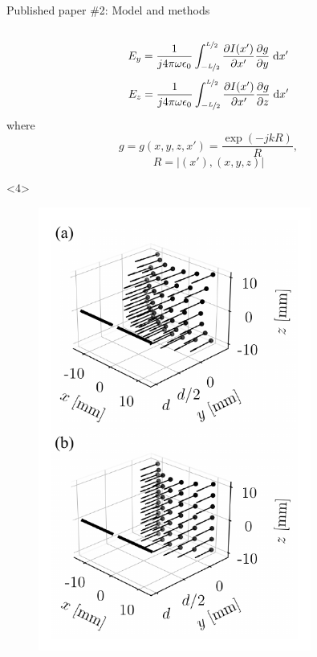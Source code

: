 \documentclass[xcolor=dvipsnames,10pt]{beamer}
\begin{document}
\begin{frame}{Published paper \#2: Model and methods}
\begin{columns}[c]
\begin{column}{0.4\textwidth}
\begin{onlyenv}
\begin{footnotesize}
\begin{equation*}
                        E_y = \frac{1}{j4\pi\omega\epsilon_0} \int_{-\nicefrac{L}{2}}^{\nicefrac{L}{2}} \frac{\partial I(x')}{\partial x'} \frac{\partial g}{\partial y} \; \mathrm{d}x'
                    \end{equation*}
                    \begin{equation*}
                        E_z = \frac{1}{j4\pi\omega\epsilon_0} \int_{-\nicefrac{L}{2}}^{\nicefrac{L}{2}} \frac{\partial I(x')}{\partial x'} \frac{\partial g}{\partial z} \; \mathrm{d}x'
                    \end{equation*}
                    where
                    \begin{equation*}
                        g = g(x, y, z, x') = \frac{\exp{(-jkR)}}{R},
                    \end{equation*}
                    \begin{equation*}
                        R = \lvert (x'), (x, y, z) \rvert
                    \end{equation*}
                \end{footnotesize}
            \end{onlyenv}
            \begin{onlyenv}<4>
                \begin{center}
                \begin{figure}
                    \includegraphics[width=0.8\textwidth]{artwork/RPD-tissue.pdf}

\end{figure}
\end{center}
\end{onlyenv}
\end{column}
\end{columns}
\end{frame}
\end{document}
